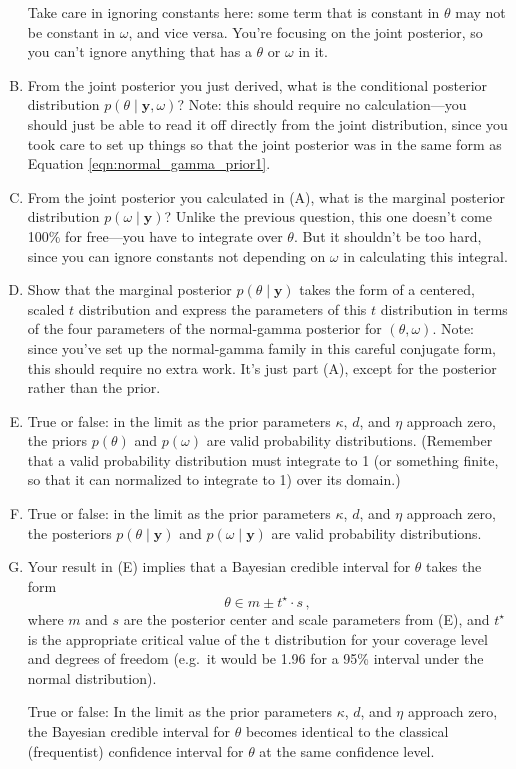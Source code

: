 \documentclass[11pt]{article}
\newcommand{\by}{\textbf{y}}
\begin{document}
\begin{enumerate}[(A)]
Take care in ignoring constants here: some term that is constant in $\theta$ may not be constant in $\omega$, and vice versa.  You're focusing on the joint posterior, so you can't ignore anything that has a $\theta$ or $\omega$ in it.


\item From the joint posterior you just derived, what is the conditional posterior distribution $p(\theta \mid \by, \omega)$?  Note: this should require no calculation---you should just be able to read it off directly from the joint distribution, since you took care to set up things so that the joint posterior was in the same form as Equation \ref{eqn:normal_gamma_prior1}.

\item From the joint posterior you calculated in (A), what is the marginal posterior distribution $p(\omega \mid \by)$?  Unlike the previous question, this one doesn't come 100\% for free---you have to integrate over $\theta$.  But it shouldn't be too hard, since you can ignore constants not depending on $\omega$ in calculating this integral.

\item Show that the marginal posterior $p(\theta \mid \by)$ takes the form of a centered, scaled $t$ distribution and express the parameters of this $t$ distribution in terms of the four parameters of the normal-gamma posterior for $(\theta, \omega)$.  Note: since you've set up the normal-gamma family in this careful conjugate form, this should require no extra work.  It's just part (A), except for the posterior rather than the prior.

\item True or false: in the limit as the prior parameters $\kappa$, $d$, and $\eta$ approach zero, the priors $p(\theta)$ and $p(\omega)$ are valid probability distributions.  (Remember that a valid probability distribution must integrate to 1 (or something finite, so that it can normalized to integrate to 1) over its domain.)

\item True or false: in the limit as the prior parameters $\kappa$, $d$, and $\eta$ approach zero, the posteriors $p(\theta \mid \by)$ and $p(\omega \mid \by)$ are valid probability distributions.

\item Your result in (E) implies that a Bayesian credible interval for $\theta$ takes the form
$$
\theta \in m \pm t^{\star} \cdot s \, ,
$$
where $m$ and $s$ are the posterior center and scale parameters from (E), and $t^\star$ is the appropriate critical value of the t distribution for your coverage level and degrees of freedom (e.g.~it would be 1.96 for a 95\% interval under the normal distribution).

True or false: In the limit as the prior parameters $\kappa$, $d$, and $\eta$ approach zero, the Bayesian credible interval for $\theta$ becomes identical to the classical (frequentist) confidence interval for $\theta$ at the same confidence level.

\end{enumerate}
\end{document}
